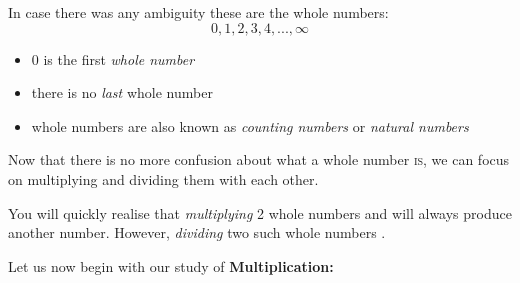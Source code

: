 In case there was any ambiguity these are the whole numbers:
\[0,1,2,3,4,...,\infty\]
\begin{itemize}
    \item $0$ is the first \emph{whole number}
    \item there is no \emph{last} whole number
    \item whole numbers are also known as \textsl{counting numbers} or \textsl{natural numbers}
\end{itemize}

Now that there is no more confusion about what a whole number \textsc{is}, we can focus on multiplying and dividing them with each other.

\begin{doublespace}
You will quickly realise that \emph{multiplying} 2 whole numbers \fillin[9] and \fillin[10] will always produce another \fillin[whole] number. However, \emph{\mbox{dividing}} two such whole numbers .
\end{doublespace}


Let us now begin with our study of \textbf{Multiplication:}

